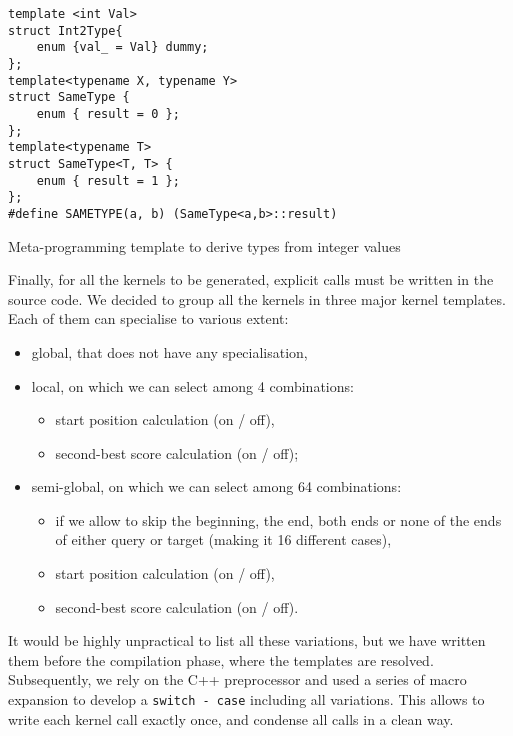 \begin{listing}[h!]
	\begin{verbatim}
template <int Val>
struct Int2Type{
	enum {val_ = Val} dummy;
};
template<typename X, typename Y>
struct SameType {
	enum { result = 0 };
};
template<typename T>
struct SameType<T, T> {
	enum { result = 1 };
};
#define SAMETYPE(a, b) (SameType<a,b>::result)
	\end{verbatim}

	
	\caption{Meta-programming template to derive types from integer values}
	\label{lst:tmp}
\end{listing}
	
Finally, for all the kernels to be generated, explicit calls must be written in the source code. We decided to group all the kernels in three major kernel templates. Each of them can specialise to various extent:

\begin{itemize}
	\item global, that does not have any specialisation,
	\item local, on which we can select among 4 combinations:
	\begin{itemize}
		\item start position calculation (on / off),
		\item second-best score calculation (on / off);
	\end{itemize}
	\item semi-global, on which we can select among 64 combinations:
	\begin{itemize}
		\item if we allow to skip the beginning, the end, both ends or none of the ends of either query or target (making it 16 different cases),
		\item start position calculation (on / off),
		\item second-best score calculation (on / off).
	\end{itemize}
\end{itemize}

It would be highly unpractical to list all these variations, but we have written them before the compilation phase, where the templates are resolved. Subsequently, we rely on the C++ preprocessor and used a series of macro expansion to develop a \verb|switch - case| including all variations. This allows to write each kernel call exactly once, and condense all calls in a clean way.

